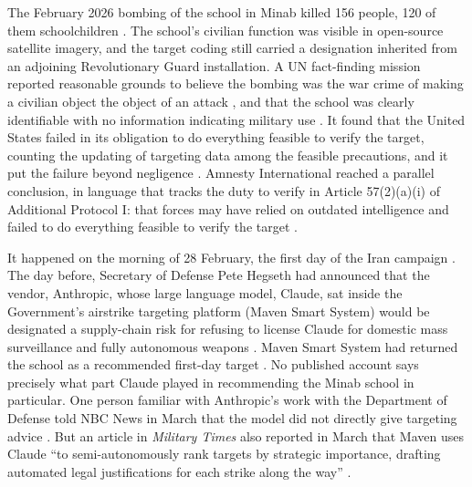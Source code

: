 
The February 2026 bombing of the school in Minab killed 156 people, 120 of them schoolchildren \autocite[para.~92]{UNFFMIran2026}. The school's civilian function was visible in open-source satellite imagery, and the target coding still carried a designation inherited from an adjoining Revolutionary Guard installation. A UN fact-finding mission reported reasonable grounds to believe the bombing was the war crime of making a civilian object the object of an attack \autocite{ohchr2026minabpress}, and that the school was clearly identifiable with no information indicating military use \autocite[paras.~81–86, 124–126]{UNFFMIran2026}. It found that the United States failed in its obligation to do everything feasible to verify the target, counting the updating of targeting data among the feasible precautions, and it put the failure beyond negligence \autocite[paras.~124–125]{UNFFMIran2026}. Amnesty International reached a parallel conclusion, in language that tracks the duty to verify in Article 57(2)(a)(i) of Additional Protocol I: that forces may have relied on outdated intelligence and failed to do everything feasible to verify the target \autocite{Amnesty2026Minab}.

It happened on the morning of 28 February, the first day of the Iran campaign \autocite{Amnesty2026Minab,crs2026iranwar}. The day before, Secretary of Defense Pete Hegseth had announced that the vendor, Anthropic, whose large language model, Claude, sat inside the Government's airstrike targeting platform (Maven Smart System) would be designated a supply-chain risk for refusing to license Claude for domestic mass surveillance and fully autonomous weapons \autocite{npr2026openai}. Maven Smart System had returned the school as a recommended first-day target \autocite{livingstone2026maven,gizmodo2026minab}. No published account says precisely what part Claude played in recommending the Minab school in particular. One person familiar with Anthropic's work with the Department of Defense told NBC News in March that the model did not directly give targeting advice \autocite{nbc2026targeting}. But an article in \emph{Military Times} also reported in March that Maven uses Claude “to semi-autonomously rank targets by strategic importance, drafting automated legal justifications for each strike along the way” \autocite{livingstone2026maven}.

